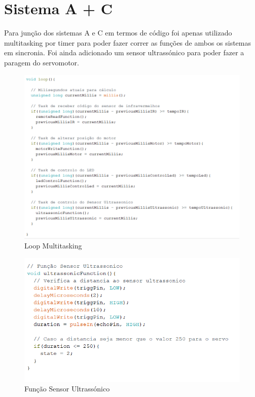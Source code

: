 \section{Sistema A + C}


Para junção dos sistemas A e C em termos de código foi apenas utilizado multitasking por timer para poder fazer correr as funções de ambos os sistemas em sincronia. Foi ainda adicionado um sensor ultrassónico para poder fazer a paragem do servomotor.

\begin{figure}[H]
    \centering
    \includegraphics[scale=0.45]{images/codigo/sisACMultitasking.png}
    \caption{Loop Multitasking}
\end{figure}


\begin{figure}[H]
    \centering
    \includegraphics[scale=0.45]{images/codigo/sisAC_ultra.png}
    \caption{Função Sensor Ultrassónico}
\end{figure}

